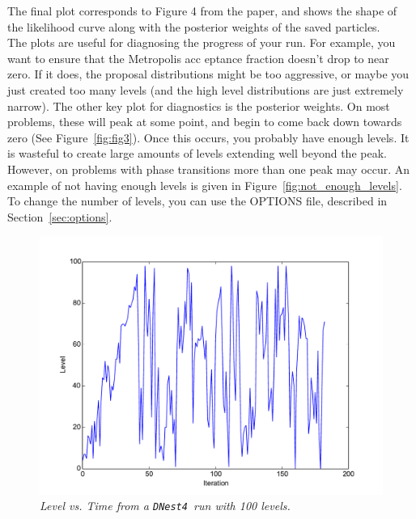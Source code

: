\documentclass[a4paper, 11pt]{article}
\newcommand{\dnest}{{\tt DNest4}}
\begin{document}
The final plot corresponds to Figure 4 from the paper, and
shows the shape of the likelihood curve along with the posterior weights of
the saved particles.\\

The plots are useful for diagnosing the progress of your run. For example, you
want to ensure that the Metropolis acc
eptance fraction doesn't drop to near
zero. If it does, the proposal distributions might be too aggressive, or maybe
you just created too many levels (and the high level distributions are just
extremely narrow). The other key plot for diagnostics is the posterior
weights. On most problems, these will peak at some point, and begin to
come back down towards zero (See Figure~\ref{fig:fig3}).
Once this occurs, you probably have enough levels.
It is wasteful to create large amounts of levels extending well beyond the peak.
However, on problems with phase transitions more than one peak may occur.
An example of not having enough levels is given in
Figure~\ref{fig:not_enough_levels}. To change the number of levels, you
can use the OPTIONS file, described in Section~\ref{sec:options}.\\

\begin{figure}
\begin{center}
\includegraphics[scale=0.5]{fig1.pdf}
\caption{\it Level vs. Time from a \dnest~run with 100 levels.\label{fig:fig1}}
\end{center}
\end{figure}
\end{document}
